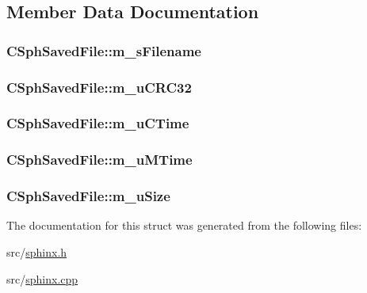 \subsection{Member Data Documentation}
\hypertarget{structCSphSavedFile_a7bde47023a22fa6c7f20d87dd7733648}{
\subsubsection[{m\-\_\-s\-Filename}]{ C\-Sph\-Saved\-File\-::m\-\_\-s\-Filename}}\label{structCSphSavedFile_a7bde47023a22fa6c7f20d87dd7733648}
\hypertarget{structCSphSavedFile_a4630ac5470e0be83d2953e64ae4fac39}{
\subsubsection[{m\-\_\-u\-C\-R\-C32}]{ C\-Sph\-Saved\-File\-::m\-\_\-u\-C\-R\-C32}}\label{structCSphSavedFile_a4630ac5470e0be83d2953e64ae4fac39}
\hypertarget{structCSphSavedFile_afeb0655a6ef44a311fb00841f9029af9}{
\subsubsection[{m\-\_\-u\-C\-Time}]{ C\-Sph\-Saved\-File\-::m\-\_\-u\-C\-Time}}\label{structCSphSavedFile_afeb0655a6ef44a311fb00841f9029af9}
\hypertarget{structCSphSavedFile_afcbccdc1643a0b1e4a2621cfe983d031}{
\subsubsection[{m\-\_\-u\-M\-Time}]{ C\-Sph\-Saved\-File\-::m\-\_\-u\-M\-Time}}\label{structCSphSavedFile_afcbccdc1643a0b1e4a2621cfe983d031}
\hypertarget{structCSphSavedFile_ae5961722297e5bb15d17cee045def1ef}{
\subsubsection[{m\-\_\-u\-Size}]{ C\-Sph\-Saved\-File\-::m\-\_\-u\-Size}}\label{structCSphSavedFile_ae5961722297e5bb15d17cee045def1ef}


The documentation for this struct was generated from the following files\-:\begin{DoxyCompactItemize}
\item 
src/\hyperlink{sphinx_8h}{sphinx.\-h}\item 
src/\hyperlink{sphinx_8cpp}{sphinx.\-cpp}\end{DoxyCompactItemize}
